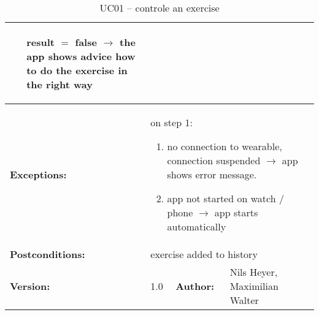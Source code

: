 \begin{table}[H]
\begin{tabular}{|l|l|l|l|l|l|}
{{\begin{itemize}[leftmargin=2.5cm]
				\item[result $=$ false] $\rightarrow$ the app shows advice how to do the exercise in the right way
			\end{itemize}
		}} \\ \hline
		\textbf{Exceptions:} & \multicolumn{5}{l|}{\parbox{0.75\textwidth}{
			$ $\\on step 1:
			\begin{enumerate}
				\item no connection to wearable, connection suspended $\rightarrow$ app shows error message.
				\item app not started on watch / phone $\rightarrow$ app starts automatically
			\end{enumerate}
		}} \\ \hline
		\textbf{Postconditions:} & \multicolumn{5}{l|}{exercise added to history} \\ \hline
		\textbf{Version:} & \multicolumn{2}{l|}{1.0} & \textbf{Author:} & \multicolumn{2}{l|}{Nils Heyer, Maximilian Walter} \\ \hline
	\end{tabular}
	\caption{UC01 -- controle an exercise}
	\label{cae}
\end{table}

\clearpage


